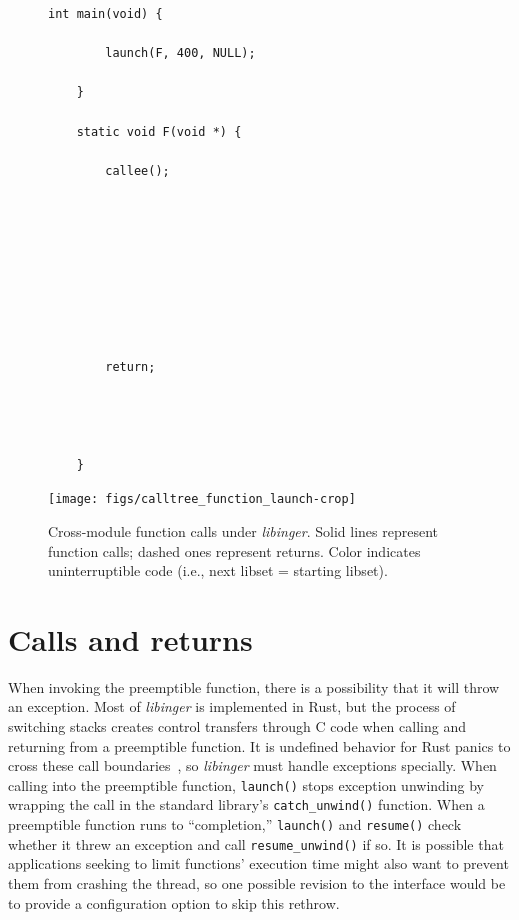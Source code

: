 \begin{figure}
	\begin{minipage}{0.25\textwidth}
	\begin{lstlisting}[basicstyle=\footnotesize\ttfamily,tabsize=2,gobble=2]
	int main(void) {

		launch(F, 400, NULL);

	}

	static void F(void *) {

		callee();









		return;




	}
	\end{lstlisting}
	\end{minipage}
%
	\begin{minipage}{0.75\textwidth}
	\texttt{[image: figs/calltree\_function\_launch-crop]}
	\end{minipage}
\caption{Cross-module function calls under \textit{libinger}. Solid lines represent function calls; dashed ones represent returns. Color indicates uninterruptible code (i.e., next libset = starting libset).}
\label{fig:ingerhook}
\end{figure}


\section{Calls and returns}
\label{sec:libinger:jumps}

When invoking the preemptible function, there is a possibility that it will throw an
exception.  Most of \textit{libinger} is implemented in Rust, but the process of
switching stacks creates control transfers through C code when calling and returning
from a preemptible function.  It is undefined behavior for Rust panics to cross these
call boundaries~\cite{www-rustlang-ub}, so \textit{libinger} must handle exceptions
specially.  When calling into the preemptible function, \texttt{launch()} stops
exception unwinding by wrapping the call in the standard library's
\texttt{catch\_unwind()} function.  When a preemptible function runs to
``completion,'' \texttt{launch()} and \texttt{resume()} check whether it threw an
exception and call \texttt{resume\_unwind()} if so.  It is possible that applications
seeking to limit functions' execution time might also want to prevent them from
crashing the thread, so one possible revision to the interface would be to provide a
configuration option to skip this rethrow.

